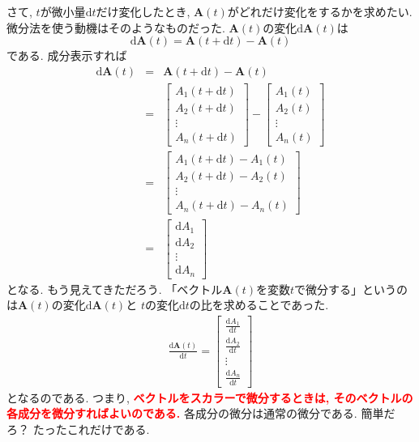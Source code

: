 さて, $t$が微小量$\mathrm{d}t$だけ変化したとき, $\bm{A}(t)$がどれだけ変化をするかを求めたい. 
微分法を使う動機はそのようなものだった. 
$\bm{A}(t)$の変化$\mathrm{d} \bm{A}(t)$は
$$
\mathrm{d} \bm{A}(t) = \bm{A} (t+ \mathrm{d} t) - \bm{A} (t)
$$
である. 成分表示すれば
\begin{eqnarray*}
\mathrm{d} \bm{A}(t) & = &\bm{A} (t+ \mathrm{d} t) - \bm{A} (t) \\
& = & \left[
\begin{array}{c}
A_1 (t+ \mathrm{d} t) \\
A_2 (t+ \mathrm{d} t) \\
\vdots \\
A_n (t+ \mathrm{d} t) 
\end{array}
\right]
- 
\left[
\begin{array}{c}
 A_1 (t) \\
 A_2 (t) \\
 \vdots \\
 A_n (t)
 \end{array}
\right] \\
& = &  
 \left[
\begin{array}{c}
A_1 (t+ \mathrm{d} t) - A_1 (t)\\
A_2 (t+ \mathrm{d} t) - A_2(t) \\
\vdots \\
A_n (t+ \mathrm{d} t) - A_n (t)
\end{array}
\right] \\
& = & \left[
\begin{array}{c}
 \mathrm{d} A_1 \\
 \mathrm{d} A_2 \\
 \vdots \\
 \mathrm{d} A_n
 \end{array}
\right]
\end{eqnarray*}
となる. もう見えてきただろう. 
「ベクトル$\bm{A}(t)$を変数$t$で微分する」というのは$\bm{A}(t)$の変化$\mathrm{d}\bm{A}(t)$と
$t$の変化$\mathrm{d}t$の比を求めることであった. 
\renewcommand{\arraystretch}{2}
\begin{eqnarray}
\frac{\mathrm{d}\bm{A}(t)}{\mathrm{d}t} = \left[
\begin{array}{c}
\displaystyle 
\frac{\mathrm{d} A_1}{\mathrm{d}t} \\
\displaystyle
\frac{\mathrm{d} A_2}{\mathrm{d}t} \\
\vdots \\
\displaystyle
\frac{\mathrm{d} A_n}{\mathrm{d}t} 
\end{array}
\right]
\label{eq:vectbibun}
\end{eqnarray}
となるのである. 
つまり, \textbf{\textcolor{red}{ベクトルをスカラーで微分するときは, そのベクトルの各成分を微分すればよいのである.}}
各成分の微分は通常の微分である. 簡単だろ？ たったこれだけである. 

